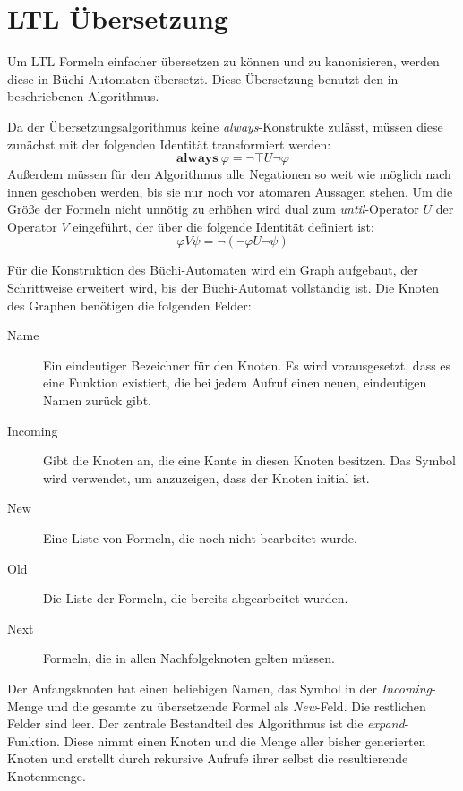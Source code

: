 \section{LTL Übersetzung}
\label{sec:ltl-translation}
Um LTL Formeln einfacher übersetzen zu können und zu kanonisieren, werden diese in Büchi-Automaten übersetzt.
Diese Übersetzung benutzt den in \cite{Gerth95simpleon-the-fly} beschriebenen Algorithmus.

Da der Übersetzungsalgorithmus keine \emph{always}-Konstrukte zulässt, müssen diese zunächst mit der folgenden Identität transformiert werden:
\[ \textbf{always}\ \varphi = \lnot\top U \lnot\varphi \]
Außerdem müssen für den Algorithmus alle Negationen so weit wie möglich nach innen geschoben werden, bis sie nur noch vor atomaren Aussagen stehen.
Um die Größe der Formeln nicht unnötig zu erhöhen wird dual zum \emph{until}-Operator $U$ der Operator $V$ eingeführt, der über die folgende Identität definiert ist:
\[ \varphi V\psi = \lnot (\lnot\varphi U\lnot\psi) \]

Für die Konstruktion des Büchi-Automaten wird ein Graph aufgebaut, der Schrittweise erweitert wird, bis der Büchi-Automat vollständig ist.
Die Knoten des Graphen benötigen die folgenden Felder:
\begin{description}
\item[Name] Ein eindeutiger Bezeichner für den Knoten.
  Es wird vorausgesetzt, dass es eine Funktion  existiert, die bei jedem Aufruf einen neuen, eindeutigen Namen zurück gibt.
\item[Incoming] Gibt die Knoten an, die eine Kante in diesen Knoten besitzen.
  Das Symbol  wird verwendet, um anzuzeigen, dass der Knoten initial ist.
\item[New] Eine Liste von Formeln, die noch nicht bearbeitet wurde.
\item[Old] Die Liste der Formeln, die bereits abgearbeitet wurden.
\item[Next] Formeln, die in allen Nachfolgeknoten gelten müssen.
\end{description}
Der Anfangsknoten hat einen beliebigen Namen, das Symbol  in der \emph{Incoming}-Menge und die gesamte zu übersetzende Formel als \emph{New}-Feld.
Die restlichen Felder sind leer.
Der zentrale Bestandteil des Algorithmus ist die \emph{expand}-Funktion.
Diese nimmt einen Knoten und die Menge aller bisher generierten Knoten und erstellt durch rekursive Aufrufe ihrer selbst die resultierende Knotenmenge.

